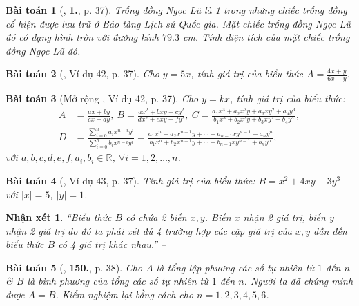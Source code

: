 \documentclass{article}
\numberwithin{equation}{section}
\newtheorem{baitoan}{Bài toán}
\newtheorem{nhanxet}{Nhận xét}[section]
\begin{document}
\begin{baitoan}[\cite{SBT_Toan_7_Canh_Dieu_tap_2}, \textbf{1.}, p. 37]
	Trống đồng Ngọc Lũ là 1 trong những chiếc trống đồng cổ hiện được lưu trữ ở Bảo tàng Lịch sử Quốc gia. Mặt chiếc trống đồng Ngọc Lũ đó có dạng hình tròn với đường kính $79.3$ \emph{cm}. Tính diện tích của mặt chiếc trống đồng Ngọc Lũ đó.
\end{baitoan}

\begin{baitoan}[\cite{Tuyen_Toan_7}, Ví dụ 42, p. 37]
	Cho $y = 5x$, tính giá trị của biểu thức $A = \frac{4x + y}{6x - y}$.
\end{baitoan}

\begin{baitoan}[Mở rộng \cite{Tuyen_Toan_7}, Ví dụ 42, p. 37]
	\label{mo rong Tuyen_Toan_7 vi du 42}
	Cho $y = kx$, tính giá trị của biểu thức:
	\begin{align*}
		A &= \frac{ax + by}{cx + dy},\ B = \frac{ax^2 + bxy + cy^2}{dx^2 + exy + fy^2},\ C = \frac{a_1x^3 + a_2x^2y + a_3xy^2 + a_4y^3}{b_1x^3 + b_2x^2y + b_3xy^2 + b_4y^3},\\
		D &= \frac{\sum_{i=0}^n a_ix^{n-i}y^i}{\sum_{i=0}^n b_ix^{n-i}y^i} = \frac{a_1x^n + a_2x^{n-1}y + \cdots + a_{n-1}xy^{n-1} + a_ny^n}{b_1x^n + b_2x^{n-1}y + \cdots + b_{n-1}xy^{n-1} + b_ny^n},
	\end{align*}
	với $a,b,c,d,e,f,a_i,b_i\in\mathbb{R}$, $\forall i = 1,2,\ldots,n$.
\end{baitoan}

\begin{baitoan}[\cite{Tuyen_Toan_7}, Ví dụ 43, p. 37]
	Tính giá trị của biểu thức: $B = x^2 + 4xy - 3y^3$ với $|x| = 5$, $|y| = 1$.
\end{baitoan}

\begin{nhanxet}
	``Biểu thức $B$ có chứa 2 biến $x,y$. Biến $x$ nhận 2 giá trị, biến $y$ nhận 2 giá trị do đó ta phải xét đủ 4 trường hợp các cặp giá trị của $x,y$ dẫn đến biểu thức $B$ có 4 giá trị khác nhau.'' -- \cite[p. 38]{Tuyen_Toan_7}
\end{nhanxet}

\begin{baitoan}[\cite{Tuyen_Toan_7}, \textbf{150.}, p. 38]
	Cho $A$ là tổng lập phương các số tự nhiên từ $1$ đến $n$ \& $B$ là bình phương của tổng các số tự nhiên từ $1$ đến $n$. Người ta đã chứng minh được $A = B$. Kiểm nghiệm lại bằng cách cho $n = 1,2,3,4,5,6$.
\end{baitoan}
\end{document}
